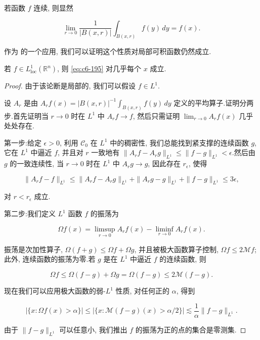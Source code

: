 
若函数 $f$ 连续, 则显然

\begin{equation}
\lim_{r\to 0}\frac{1}{|B(x, r)|}\int_{B(x, r)} f(y)\, dy = f(x).\label{eq:c6-195}
\end{equation}

作为 的一个应用, 我们可以证明这个性质对局部可积函数仍然成立.

\begin{corollary}\label{cor:c6-2.7}
若 $f\in L^1_{\mathrm{loc}}(\mathbb{R}^n)$, 则 \eqref{eq:c6-195} 对几乎每个 $x$ 成立.
\end{corollary}

\begin{proof}
由于该论断是局部的, 我们可以假设 $f\in L^1$.

设 $A_r$ 是由 $A_r f(x) = |B(x, r)|^{-1}\int_{B(x, r)} f(y)\, dy$ 定义的平均算子.证明分两步.首先证明当 $r\to 0$ 时在 $L^1$ 中 $A_r f\to f$, 然后只需证明 $\lim_{r\to 0}A_r f(x)$ 几乎处处存在.

第一步:给定 $\epsilon>0$, 利用 $\mathcal{C}_0$ 在 $L^1$ 中的稠密性, 我们总能找到紧支撑的连续函数 $g$, 它在 $L^1$ 中逼近 $f$, 并且对 $r$ 一致地有 $\|A_r f - A_r g\|_{L^1}\le\|f-g\|_{L^1}<\epsilon$.然后由 $g$ 的一致连续性, 当 $r\to 0$ 时在 $L^1$ 中 $A_r g\to g$, 因此存在 $r_\epsilon$, 使得

\[
\|A_r f - f\|_{L^1} \le \|A_r f - A_r g\|_{L^1} + \|A_r g - g\|_{L^1} + \|f - g\|_{L^1} \le 3\epsilon,
\]

对 $r < r_\epsilon$ 成立.

第二步:我们定义 $L^1$ 函数 $f$ 的振荡为

\[
\Omega f(x) = \limsup_{r\to 0}A_r f(x) - \liminf_{r\to 0}A_r f(x).
\]

振荡是次加性算子, $\Omega(f+g)\le\Omega f + \Omega g$, 并且被极大函数算子控制, $\Omega f\le 2\mathcal{M}f$;此外, 连续函数的振荡为零.若 $g$ 是在 $L^1$ 中逼近 $f$ 的连续函数, 则

\[
\Omega f \le \Omega(f-g) + \Omega g = \Omega(f-g) \le 2\mathcal{M}(f-g).
\]

现在我们可以应用极大函数的弱-$L^1$ 性质, 对任何正的 $\alpha$, 得到

\[
|\{x : \Omega f(x) > \alpha\}| \le |\{x : \mathcal{M}(f-g)(x) > \alpha/2\}| \lesssim \frac{1}{\alpha}\|f-g\|_{L^1}.
\]

由于 $\|f-g\|_{L^1}$ 可以任意小, 我们推出 $f$ 的振荡为正的点的集合是零测集.
\end{proof}

